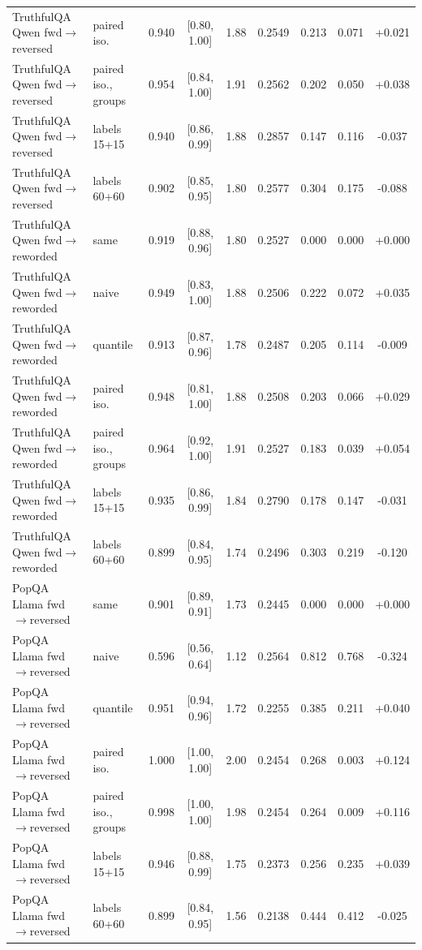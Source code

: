 \documentclass[11pt]{article}
\theoremstyle{definition}
\theoremstyle{remark}
\newcommand{\1}{\mathbf{1}}
\begin{document}
\begin{center}
\begin{tabular}{llccccccc}
TruthfulQA Qwen fwd$\to$reversed & paired iso. & 0.940 & [0.80, 1.00] & 1.88 & 0.2549 & 0.213 & 0.071 & +0.021\\
TruthfulQA Qwen fwd$\to$reversed & paired iso., groups & 0.954 & [0.84, 1.00] & 1.91 & 0.2562 & 0.202 & 0.050 & +0.038\\
TruthfulQA Qwen fwd$\to$reversed & labels 15+15 & 0.940 & [0.86, 0.99] & 1.88 & 0.2857 & 0.147 & 0.116 & -0.037\\
TruthfulQA Qwen fwd$\to$reversed & labels 60+60 & 0.902 & [0.85, 0.95] & 1.80 & 0.2577 & 0.304 & 0.175 & -0.088\\
\midrule
TruthfulQA Qwen fwd$\to$reworded & same & 0.919 & [0.88, 0.96] & 1.80 & 0.2527 & 0.000 & 0.000 & +0.000\\
TruthfulQA Qwen fwd$\to$reworded & naive & 0.949 & [0.83, 1.00] & 1.88 & 0.2506 & 0.222 & 0.072 & +0.035\\
TruthfulQA Qwen fwd$\to$reworded & quantile & 0.913 & [0.87, 0.96] & 1.78 & 0.2487 & 0.205 & 0.114 & -0.009\\
TruthfulQA Qwen fwd$\to$reworded & paired iso. & 0.948 & [0.81, 1.00] & 1.88 & 0.2508 & 0.203 & 0.066 & +0.029\\
TruthfulQA Qwen fwd$\to$reworded & paired iso., groups & 0.964 & [0.92, 1.00] & 1.91 & 0.2527 & 0.183 & 0.039 & +0.054\\
TruthfulQA Qwen fwd$\to$reworded & labels 15+15 & 0.935 & [0.86, 0.99] & 1.84 & 0.2790 & 0.178 & 0.147 & -0.031\\
TruthfulQA Qwen fwd$\to$reworded & labels 60+60 & 0.899 & [0.84, 0.95] & 1.74 & 0.2496 & 0.303 & 0.219 & -0.120\\
\midrule
PopQA Llama fwd$\to$reversed & same & 0.901 & [0.89, 0.91] & 1.73 & 0.2445 & 0.000 & 0.000 & +0.000\\
PopQA Llama fwd$\to$reversed & naive & 0.596 & [0.56, 0.64] & 1.12 & 0.2564 & 0.812 & 0.768 & -0.324\\
PopQA Llama fwd$\to$reversed & quantile & 0.951 & [0.94, 0.96] & 1.72 & 0.2255 & 0.385 & 0.211 & +0.040\\
PopQA Llama fwd$\to$reversed & paired iso. & 1.000 & [1.00, 1.00] & 2.00 & 0.2454 & 0.268 & 0.003 & +0.124\\
PopQA Llama fwd$\to$reversed & paired iso., groups & 0.998 & [1.00, 1.00] & 1.98 & 0.2454 & 0.264 & 0.009 & +0.116\\
PopQA Llama fwd$\to$reversed & labels 15+15 & 0.946 & [0.88, 0.99] & 1.75 & 0.2373 & 0.256 & 0.235 & +0.039\\
PopQA Llama fwd$\to$reversed & labels 60+60 & 0.899 & [0.84, 0.95] & 1.56 & 0.2138 & 0.444 & 0.412 & -0.025\\

\end{tabular}
\end{center}
\end{document}
